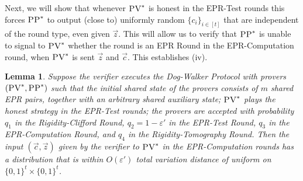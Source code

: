 \documentclass[11pt]{article}
\newtheorem{lemma}[theorem]{Lemma}
\theoremstyle{remark}
\theoremstyle{definition}
\newcommand{\eps}{\varepsilon}
\newcommand{\pv}{\textsc{PV}}
\newcommand{\pp}{\textsc{PP}}
\begin{document}
Next, we will show that whenever $\pv^*$ is honest in the EPR-Test rounds this forces $\pp^*$ to output (close to) uniformly random $\{c_i\}_{i\in [t]}$ that are independent of the round type, even given $\vec{z}$. This will allow us to verify that $\pp^*$ is unable to signal to $\pv^*$ whether the round is an EPR Round in the EPR-Computation round, when $\pv^*$ is sent $\vec{z}$ and $\vec{c}$. This establishes (iv). 


\begin{lemma}\label{lem:ci-unif}
Suppose the verifier executes the Dog-Walker Protocol with provers $(\pv^*,\pp^*)$ such that the initial shared state of the provers consists of $m$ shared EPR pairs, together with an arbitrary shared auxiliary state; $\pv^*$ plays the honest strategy in the EPR-Test rounds; the provers are accepted with probability $q_1$ in the Rigidity-Clifford Round, $q_2 = 1-\eps'$ in the EPR-Test Round, $q_3$ in the EPR-Computation Round, and $q_4$ in the Rigidity-Tomography Round. Then the input $(\vec{c},\vec{z})$ given by the verifier to $\pv^*$ in the EPR-Computation rounds has a distribution that is within $O(\eps')$ total variation distance of uniform on $\{0,1\}^t\times\{0,1\}^t$. 
\end{lemma}
\end{document}
